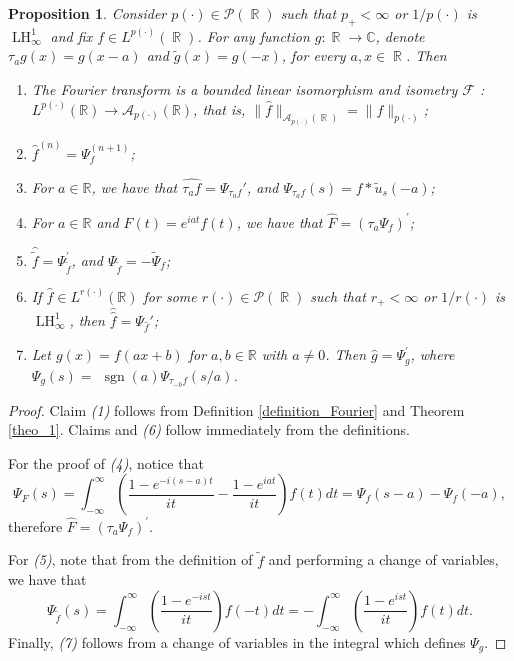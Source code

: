\documentclass[11pt,reqno]{amsart}
\newtheorem{prop}[theorem]{Proposition}
\theoremstyle{definition}
\theoremstyle{definition}
\theoremstyle{definition}
\DeclareMathOperator{\R}{\mathbb{R}}
\newcommand{\p}{p(\cdot)}
\newcommand{\Lp}{L^{\p}(\R)}
\newcommand{\LH}{\operatorname{LH}_\infty^1}
\begin{document}
\begin{prop}\label{prop_properties}
    Consider $\p\in\mathcal{P}(\R)$ such that $p_{+}<\infty$ or $1/\p$ is $\LH$ and fix  $f\in\Lp$. For any function $g:\R\to\mathbb{C}$, denote $\tau_ag(x)=g(x-a)$ and $\tilde{g}(x)=g(-x)$, for every $a,x\in\R$. Then
    \begin{enumerate}
               \item  The Fourier transform is a bounded linear isomorphism and isometry $\mathcal{F}$ : $L^{\p}(\mathbb{R}) \to \mathcal{A}_{\p}(\mathbb{R})$, that is, $\|\hat{f}\|_{\mathcal{A}_{\p}(\R)}=\|f\|_{\p}$;

\item $\hat{f}^{(n)}=\Psi_f^{(n+1)}$;
\item For $a \in \mathbb{R}$, we have that  $\widehat{\tau_a f}=\Psi_{\tau_a f}'$, and $\Psi_{\tau_a f}(s)=f * \tilde{u}_s(-a)$;
\item For $a \in \mathbb{R}$ and $F(t)={e}^{{i} a t} f(t)$, we have that $\widehat{F}=\left(\tau_a \Psi_f\right)^{\prime}$;
\item $\hat{\tilde{f}}=\Psi_{\tilde{f}}^{\prime}$, and $\Psi_{\tilde{f}}=-\widetilde{\Psi}_f$;
\item If $\hat{f} \in L^{r(\cdot)}(\mathbb{R})$ for some $r(\cdot)\in \mathcal{P}(\R)$ such that $r_{+}<\infty$ or $1/r(\cdot)$ is $\LH$, then $\hat{\hat{f}}=\Psi_{\widehat{f}}'$;
\item Let $g(x)=f(a x+b)$ for $a, b \in \mathbb{R}$ with $a \neq 0$. Then $\hat{g}=\Psi_g^{\prime}$, where $\Psi_g(s)=$ $\operatorname{sgn}(a) \Psi_{\tau_{-b} f}(s / a)$.
    \end{enumerate}
\end{prop}
\begin{proof}
    Claim {\it (1)} follows from Definition \ref{definition_Fourier} and Theorem \ref{theo_1}.
Claims  and {\it (6)} 
follow immediately from the definitions.

\noindent For the proof of {\it (4)}, notice that
$$
\Psi_F(s)=\int_{-\infty}^{\infty}\left(\frac{1-{e}^{-{i}(s-a) t}}{{i} t}-\frac{1-{e}^{{i} a t}}{{i} t}\right) f(t) {d} t=\Psi_f(s-a)-\Psi_f(-a),
$$
therefore $\widehat{F}=\left(\tau_a \Psi_f\right)^{\prime}$.

\noindent For {\it (5)}, note that from the definition of $\tilde{f}$ and performing a change of variables, we have that
$$
\Psi_{\tilde{f}}(s)=\int_{-\infty}^{\infty}\left(\frac{1-{e}^{-{i} s t}}{{i} t}\right) f(-t) {d} t=-\int_{-\infty}^{\infty}\left(\frac{1-{e}^{{i} s t}}{{i} t}\right) f(t) {d} t.
$$
\noindent Finally, {\it (7)} follows from a change of variables in the integral which defines $\Psi_g$.
\end{proof}
\end{document}
